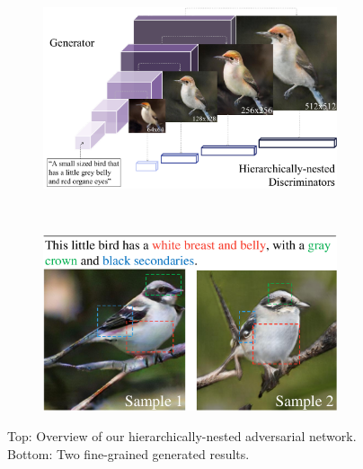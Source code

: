 \documentclass[10pt,twocolumn,letterpaper]{article}
\begin{document}

\begin{figure}[t]
	\centering
	\begin{subfigure}[t]{0.5\textwidth}
		\includegraphics[width=0.95\textwidth]{figure/intro2.pdf}
	\end{subfigure} \\
\centering
	\begin{subfigure}[t]{0.5\textwidth}
		\includegraphics[width=0.95\textwidth,height=0.55\textwidth]{figure/single_view.pdf}
	\end{subfigure}
	\vspace{-.6cm}
	\caption{Top: Overview of our hierarchically-nested adversarial network. Bottom: Two fine-grained generated results. \label{fig:intro}} 	
	\vspace{-.8cm}
\end{figure}
\end{document}
